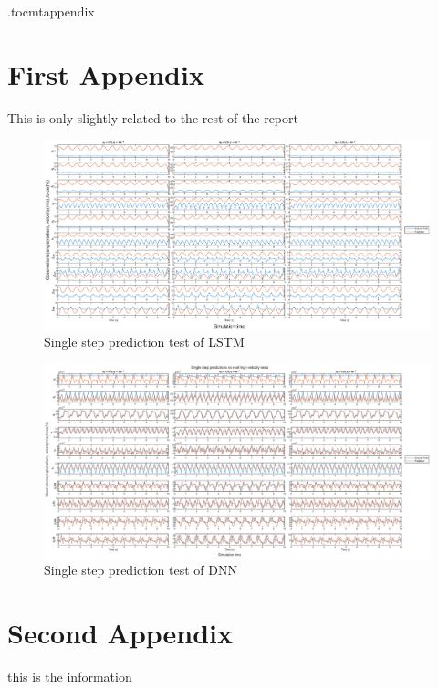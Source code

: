 \newpage
\appendix
\newpage

\etocdepthtag.toc{mtappendix}
\tableofcontents
\pagestyle{plain}
\newpage
{}

\chapter{First Appendix}
This is only slightly related to the rest of the report
\begin{figure}[ht]
    \centering
    \includegraphics[width=\linewidth]{img/AppA/lstm_pred.eps}
    \caption{Single step prediction test of LSTM}
    \label{fig:lstm_test}
\end{figure}

\begin{figure}[ht]
    \centering
    \includegraphics[width=\linewidth]{img/AppA/model_all.eps}
    \caption{Single step prediction test of DNN}
    \label{fig:DNN_test}
\end{figure}


\chapter{Second Appendix}
this is the information

